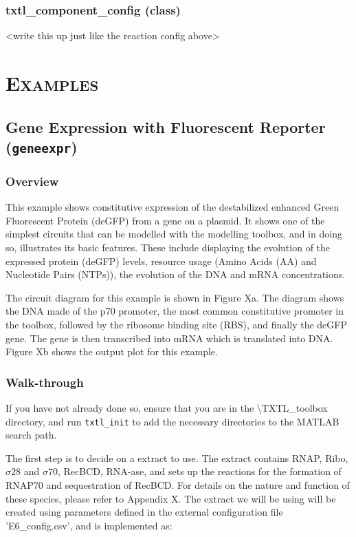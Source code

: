 \documentclass[english]{report}
\begin{document}
		\subsection*{txtl\_component\_config (class)}	
		{\color{red} <write this up just like the reaction config above>}	



\chapter{\textsc{Examples}}
	\section{Gene Expression with Fluorescent Reporter (\texttt{geneexpr})}
		\subsection{Overview}
		This example shows constitutive expression of the destabilized enhanced Green Fluorescent Protein (deGFP) from a gene on a plasmid. It shows one of the simplest circuits that can be modelled with the modelling toolbox, and in doing so, illustrates its basic features. These include displaying the evolution of the expressed protein (deGFP) levels, resource usage (Amino Acids (AA) and Nucleotide Pairs (NTPs)), the evolution of the DNA and mRNA concentrations. 
		
		The circuit diagram for this example is shown in {\color{red}Figure Xa}. 
		The diagram shows the DNA made of the p70 promoter, the most common constitutive promoter in the toolbox, followed by the ribosome binding site (RBS), and finally the deGFP gene. The gene is then transcribed into mRNA which is translated into DNA. 
		{\color{red}Figure Xb} shows the output plot for this example. 
		
		
		
		\subsection{Walk-through}
		If you have not already done so, ensure that you are in the \textsf{\textbackslash TXTL\_toolbox} directory, and run \texttt{txtl\_init} to add the necessary directories to the MATLAB search path. 
			
		The first step is to decide on a extract to use. The extract contains RNAP, Ribo, $\sigma 28$ and $\sigma 70$, RecBCD, RNA-ase, and sets up the reactions for the formation of RNAP70 and sequestration of RecBCD. For details on the nature and function of these species, please refer to {\color{red}Appendix X}. The extract we will be using will be created using parameters defined in the external configuration file \textsf{'E6\_config.csv'}, and is implemented as: \\
		
\end{document}
